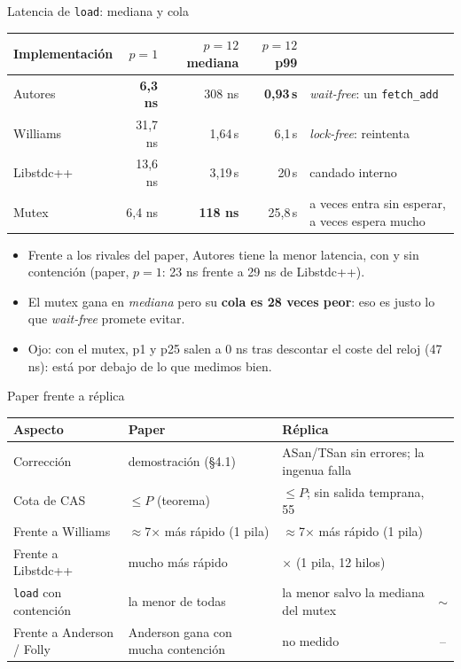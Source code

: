 \documentclass[aspectratio=169,11pt]{beamer}
\newcommand{\si}{\textcolor{ok}{\ding{51}}}
\newcommand{\casi}{\textcolor{acento}{$\sim$}}
\newcommand{\us}{\,\textmu s}
\newcommand{\clave}[1]{\textcolor{acento}{\textbf{#1}}}
\begin{document}
\begin{frame}{Latencia de \texttt{load}: mediana y cola}
  \small
  \begin{tabularx}{\linewidth}{@{}l r r r X@{}}
    \toprule
    \textbf{Implementación} & \textbf{$p=1$} & \textbf{$p=12$ mediana} & \textbf{$p=12$ p99} & \\
    \midrule
    Autores & \textbf{6,3 ns} & 308 ns & \textbf{0,93\us} & \emph{wait-free}: un \texttt{fetch\_add}\\
    Williams & 31,7 ns & 1,64\us & 6,1\us & \emph{lock-free}: reintenta\\
    Libstdc++ & 13,6 ns & 3,19\us & 20\us & candado interno\\
    Mutex & 6,4 ns & \textbf{118 ns} & \textcolor{mal}{25,8\us} & a veces entra sin esperar, a veces espera mucho\\
    \bottomrule
  \end{tabularx}
  \bigskip
  \begin{itemize}\small
    \item Frente a los rivales del paper, Autores tiene la menor latencia, con y sin contención (paper, $p=1$: 23 ns frente a 29 ns de Libstdc++).
    \item El mutex gana en \emph{mediana} pero su \clave{cola es 28 veces peor}: eso es justo lo que \emph{wait-free} promete evitar.
    \item Ojo: con el mutex, p1 y p25 salen a 0 ns tras descontar el coste del reloj (47 ns): está por debajo de lo que medimos bien.
  \end{itemize}
\end{frame}

\begin{frame}{Paper frente a réplica}
  \small
  \begin{tabularx}{\linewidth}{@{}>{\raggedright\arraybackslash}X >{\raggedright\arraybackslash}X >{\raggedright\arraybackslash}X c@{}}
    \toprule
    \textbf{Aspecto} & \textbf{Paper} & \textbf{Réplica} & \\
    \midrule
    Corrección & demostración (§4.1) & ASan/TSan sin errores; la ingenua falla & \si\\
    Cota de CAS & $\le P$ (teorema) & 8 $\le P$; sin salida temprana, 55 & \si\\
    Frente a Williams & $\approx$7× más rápido (1 pila) & $\approx$7× más rápido (1 pila) & \si\\
    Frente a Libstdc++ & mucho más rápido & 24× (1 pila, 12 hilos) & \si\\
    \texttt{load} con contención & la menor de todas & la menor salvo la mediana del mutex & \casi\\
    Frente a Anderson / Folly & Anderson gana con mucha contención & no medido & --\\
    \bottomrule
  \end{tabularx}
\end{frame}
\end{document}
